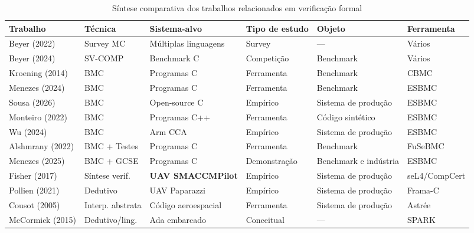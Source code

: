 \begin{table}[p]
\centering
\caption{Síntese comparativa dos trabalhos relacionados em verificação formal}
\label{tab:trabalhos-relacionados}
\scriptsize
\renewcommand{\arraystretch}{0.92}
\setlength{\tabcolsep}{2pt}
\begin{tabular}{|p{2.5cm}|p{2.0cm}|p{2.2cm}|p{1.7cm}|p{2.1cm}|p{1.6cm}|}
\hline
\textbf{Trabalho} & \textbf{Técnica} & \textbf{Sistema-alvo} &
\textbf{Tipo de estudo} & \textbf{Objeto} & \textbf{Ferramenta} \\
\hline
Beyer (2022)        & Survey MC       & Múltiplas linguagens    & Survey     & ---                   & Vários    \\ \hline
Beyer (2024)        & SV-COMP         & Benchmark C             & Competição & Benchmark             & Vários    \\ \hline
Kroening (2014)     & BMC             & Programas C             & Ferramenta & Benchmark             & CBMC      \\ \hline
Menezes (2024)      & BMC             & Programas C             & Ferramenta & Benchmark             & ESBMC     \\ \hline
Sousa (2026)        & BMC             & Open-source C           & Empírico   & Sistema de produção   & ESBMC     \\ \hline
Monteiro (2022)     & BMC             & Programas C++           & Ferramenta & Código sintético      & ESBMC     \\ \hline
Wu (2024)           & BMC             & Arm CCA                 & Empírico   & Sistema de produção   & ESBMC     \\ \hline
Alshmrany (2022)    & BMC + Testes    & Programas C             & Ferramenta & Benchmark             & FuSeBMC   \\ \hline
Menezes (2025)      & BMC + GCSE      & Programas C             & Demonstração & Benchmark e indústria & ESBMC   \\ \hline
Fisher (2017)       & Síntese verif.  & \textbf{UAV SMACCMPilot}& Empírico   & Sistema de produção   & seL4/CompCert \\ \hline
Pollien (2021)      & Dedutivo        & UAV Paparazzi           & Empírico   & Sistema de produção   & Frama-C   \\ \hline
Cousot (2005)       & Interp. abstrata& Código aeroespacial     & Ferramenta & Sistema de produção   & Astrée    \\ \hline
McCormick (2015)    & Dedutivo/ling.  & Ada embarcado           & Conceitual & ---                   & SPARK     \\ \hline

\end{tabular}
\end{table}

